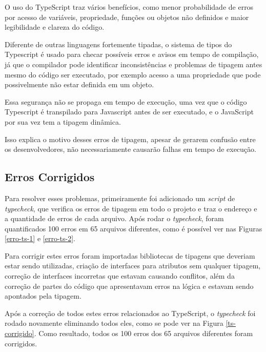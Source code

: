 O uso do TypeScript traz vários benefícios, como menor probabilidade de erros por acesso de variáveis, propriedade, funções ou objetos não definidos e maior legibilidade e clareza do código.

Diferente de outras linguagens fortemente tipadas, o sistema de tipos do Typescript é usado para checar possíveis erros e avisos em tempo de compilação, já que o compilador pode identificar inconsistências e problemas de tipagem antes mesmo do código ser executado, por exemplo acesso a uma propriedade que pode possivelmente não estar definida em um objeto. 

Essa segurança não se propaga em tempo de execução, uma vez que o código Typescript é transpilado para Javascript antes de ser executado, e o JavaScript por sua vez tem a tipagem dinâmica. 

Isso explica o motivo desses erros de tipagem, apesar de gerarem confusão entre os desenvolvedores, não necessariamente causarão falhas em tempo de execução.

\subsection{Erros Corrigidos}
Para resolver esses problemas, primeiramente foi adicionado um \textit{script} de \textit{typecheck}, que verifica os erros de tipagem em todo o projeto e traz o endereço e a quantidade de erros de cada arquivo. Após rodar o \textit{typecheck}, foram quantificados 100 erros em 65 arquivos diferentes, como é possível ver nas Figuras \ref{erro-ts-1} e \ref{erro-ts-2}.

Para corrigir estes erros foram importadas bibliotecas de tipagens que deveriam estar sendo utilizadas, criação de interfaces para atributos sem qualquer tipagem, correção de interfaces incorretas que estavam causando conflitos, além da correção de partes do código que apresentavam erros na lógica e estavam sendo apontados pela tipagem.

Após a correção de todos estes erros relacionados ao TypeScript, o \textit{typecheck} foi rodado novamente eliminando todos eles, como se pode ver na Figura \ref{ts-corrigido}. Como resultado, todos os 100 erros dos 65 arquivos diferentes foram corrigidos.

